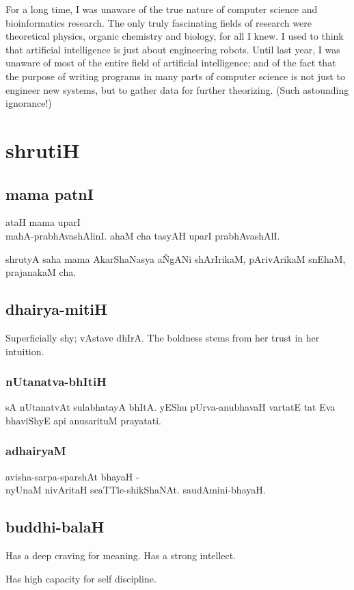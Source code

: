 \documentclass[oneside, article]{memoir}
\begin{document}
For a long time, I was unaware of the true nature of computer science and bioinformatics research. The only truly fascinating fields of research were theoretical physics, organic chemistry and biology, for all I knew. I used to think that artificial intelligence is just about engineering robots. Until last year, I was unaware of most of the entire field of artificial intelligence; and of the fact that the purpose of writing programs in many parts of computer science is not just to engineer new systems, but to gather data for further theorizing. (Such astounding ignorance!)

\chapter{shrutiH}
\section{mama patnI}
ataH mama uparI \\
mahA-prabhAvashAlinI. ahaM cha tasyAH uparI prabhAvashAlI.

shrutyA saha mama AkarShaNasya a\~NgANi shArIrikaM, pArivArikaM snEhaM, prajanakaM cha. 

\section{dhairya-mitiH}
Superficially shy; vAstave dhIrA. The boldness stems from her trust in her intuition.

\subsection{nUtanatva-bhItiH}
sA nUtanatvAt sulabhatayA bhItA. yEShu pUrva-anubhavaH vartatE tat Eva bhaviShyE api anusarituM prayatati.

\subsection{adhairyaM}
avisha-sarpa-sparshAt bhayaH - \\nyUnaM nivAritaH seaTTle-shikShaNAt. saudAmini-bhayaH.

\section{buddhi-balaH}
Has a deep craving for meaning. Has a strong intellect.

Has high capacity for self discipline.
\end{document}
